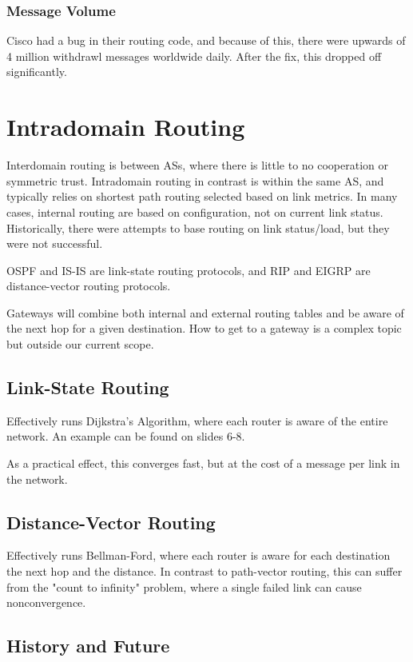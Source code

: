 \documentclass{idc_msc}
\begin{document}
\subsubsection{Message Volume}

Cisco had a bug in their routing code, and because of this, there were upwards of 4 million withdrawl messages worldwide daily.
After the fix, this dropped off significantly.

\section{Intradomain Routing}

Interdomain routing is between ASs, where there is little to no cooperation or symmetric trust.
Intradomain routing in contrast is within the same AS, and typically relies on shortest path routing selected based on link metrics.
In many cases, internal routing are based on configuration, not on current link status.
Historically, there were attempts to base routing on link status/load, but they were not successful.

OSPF and IS-IS are link-state routing protocols, and RIP and EIGRP are distance-vector routing protocols.

Gateways will combine both internal and external routing tables and be aware of the next hop for a given destination.
How to get to a gateway is a complex topic but outside our current scope.

\subsection{Link-State Routing}

Effectively runs Dijkstra's Algorithm, where each router is aware of the entire network.
An example can be found on slides 6-8.

As a practical effect, this converges fast, but at the cost of a message per link in the network.

\subsection{Distance-Vector Routing}

Effectively runs Bellman-Ford, where each router is aware for each destination the next hop and the distance.
In contrast to path-vector routing, this can suffer from the "count to infinity" problem, where a single failed link can cause nonconvergence.

\subsection{History and Future}
\end{document}
